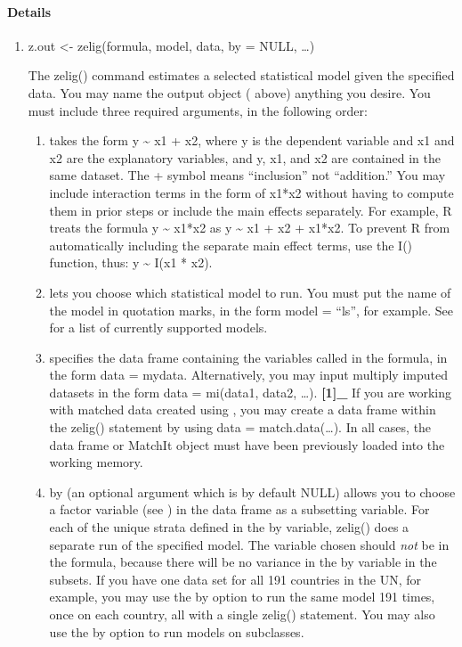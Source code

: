 \documentclass[letterpaper,10pt,english]{sphinxmanual}
\begin{document}
\paragraph{Details}
\label{docs/user_guide:details}\begin{enumerate}
\item {} 
z.out \textless{}- zelig(formula, model, data, by = NULL, …)

The zelig() command estimates a selected statistical model given the
specified data. You may name the output object ( above)
anything you desire. You must include three required arguments, in
the following order:
\begin{enumerate}
\item {} 
 takes the form y \textasciitilde{} x1 + x2, where y is the dependent
variable and x1 and x2 are the explanatory variables, and y, x1,
and x2 are contained in the same dataset. The + symbol means
“inclusion” not “addition.” You may include interaction terms in
the form of x1*x2 without having to compute them in prior steps
or include the main effects separately. For example, R treats the
formula y \textasciitilde{} x1*x2 as y \textasciitilde{} x1 + x2 + x1*x2. To prevent R from
automatically including the separate main effect terms, use the
I() function, thus: y \textasciitilde{} I(x1 * x2).

\item {} 
 lets you choose which statistical model to run. You must
put the name of the model in quotation marks, in the form model =
“ls”, for example. See for a list of currently supported models.

\item {} 
 specifies the data frame containing the variables called
in the formula, in the form data = mydata. Alternatively, you may
input multiply imputed datasets in the form data = mi(data1,
data2, …). {\color{red}\bfseries{}{[}1{]}\_} If you are working with matched data created using
, you may create a data frame within the zelig() statement by
using data = match.data(…). In all cases, the data frame or
MatchIt object must have been previously loaded into the working
memory.

\item {} 
by (an optional argument which is by default NULL) allows you to
choose a factor variable (see ) in the data frame as a subsetting
variable. For each of the unique strata defined in the by
variable, zelig() does a separate run of the specified model. The
variable chosen should \emph{not} be in the formula, because there will
be no variance in the by variable in the subsets. If you have one
data set for all 191 countries in the UN, for example, you may use
the by option to run the same model 191 times, once on each
country, all with a single zelig() statement. You may also use the
by option to run models on subclasses.


\end{enumerate}
\end{enumerate}
\end{document}
